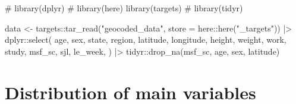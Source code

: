 \documentclass[
  12pt,
  a4paper,
  oneside]{tesesusp}
\newenvironment{Shaded}{\begin{snugshade}}{\end{snugshade}}
\newcommand{\AttributeTok}[1]{\textcolor[rgb]{0.40,0.45,0.13}{#1}}
\newcommand{\CommentTok}[1]{\textcolor[rgb]{0.37,0.37,0.37}{#1}}
\newcommand{\FunctionTok}[1]{\textcolor[rgb]{0.28,0.35,0.67}{#1}}
\newcommand{\NormalTok}[1]{\textcolor[rgb]{0.00,0.23,0.31}{#1}}
\newcommand{\OtherTok}[1]{\textcolor[rgb]{0.00,0.23,0.31}{#1}}
\newcommand{\SpecialCharTok}[1]{\textcolor[rgb]{0.37,0.37,0.37}{#1}}
\newcommand{\StringTok}[1]{\textcolor[rgb]{0.13,0.47,0.30}{#1}}
\begin{document}
\begin{Shaded}
\begin{Highlighting}[numbers=left,,]
\CommentTok{\# library(dplyr)}
\CommentTok{\# library(here)}
\FunctionTok{library}\NormalTok{(targets)}
\CommentTok{\# library(tidyr)}

\NormalTok{data }\OtherTok{\textless{}{-}} 
\NormalTok{  targets}\SpecialCharTok{::}\FunctionTok{tar\_read}\NormalTok{(}\StringTok{"geocoded\_data"}\NormalTok{, }\AttributeTok{store =}\NormalTok{ here}\SpecialCharTok{::}\FunctionTok{here}\NormalTok{(}\StringTok{"\_targets"}\NormalTok{)) }\SpecialCharTok{|\textgreater{}}
\NormalTok{  dplyr}\SpecialCharTok{::}\FunctionTok{select}\NormalTok{(}
\NormalTok{    age, sex, state, region, latitude, longitude, height, weight, work, study,}
\NormalTok{    msf\_sc, sjl, le\_week, }
\NormalTok{    ) }\SpecialCharTok{|\textgreater{}}
\NormalTok{  tidyr}\SpecialCharTok{::}\FunctionTok{drop\_na}\NormalTok{(msf\_sc, age, sex, latitude)}
\end{Highlighting}
\end{Shaded}

\hypertarget{distribution-of-main-variables}{%
\section{Distribution of main
variables}\label{distribution-of-main-variables}}
\end{document}
